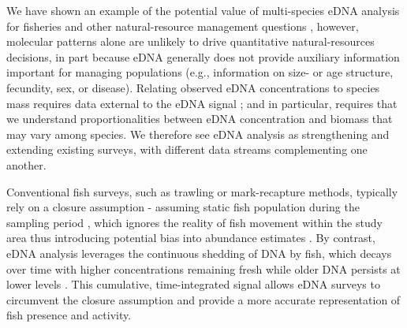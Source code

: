 \documentclass{article}
\begin{document}
We have shown an example of the potential value of multi-species eDNA analysis for fisheries and other natural-resource management questions \cite{ledger2024,stoeckle2024}, however, molecular patterns alone are unlikely to drive quantitative natural-resources decisions, in part because eDNA generally does not provide auxiliary information important for managing populations (e.g., information on size- or age structure, fecundity, sex, or disease). Relating observed eDNA concentrations to species mass requires data external to the eDNA signal \cite{guri2024a}; and in particular, requires that we understand proportionalities between eDNA concentration and biomass that may vary among species. We therefore see eDNA analysis as strengthening and extending existing surveys, with different data streams complementing one another. 

Conventional fish surveys, such as trawling or mark-recapture methods, typically rely on a closure assumption - assuming static fish population during the sampling period \cite{bailey2014}, which ignores the reality of fish movement within the study area thus introducing potential bias into abundance estimates \cite{rota2009}. By contrast, eDNA analysis leverages the continuous shedding of DNA by fish, which decays over time with higher concentrations remaining fresh while older DNA persists at lower levels \cite{thomsen2015,jerde2011}. This cumulative, time-integrated signal allows eDNA surveys to circumvent the closure assumption and provide a more accurate representation of fish presence and activity.



\end{document}

